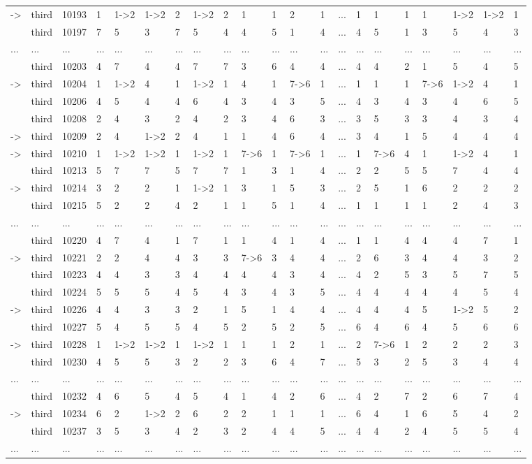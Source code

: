 \begin{landscape}
{\begin{longtable}{lllllllllllllllllllll}
-\textgreater &third&10193&1&1-\textgreater 2&1-\textgreater 2&2&1-\textgreater 2&2&1&1&2&1&...&1&1&1&1&1-\textgreater 2&1-\textgreater 2&1\tabularnewline
&third&10197&7&5&3&7&5&4&4&5&1&4&...&4&5&1&3&5&4&3\tabularnewline
...&...&...&...&...&...&...&...&...&...&...&...&...&...&...&...&...&...&...&...&...\tabularnewline
&third&10203&4&7&4&4&7&7&3&6&4&4&...&4&4&2&1&5&4&5\tabularnewline
-\textgreater &third&10204&1&1-\textgreater 2&4&1&1-\textgreater 2&1&4&1&7-\textgreater 6&1&...&1&1&1&7-\textgreater 6&1-\textgreater 2&4&1\tabularnewline
&third&10206&4&5&4&4&6&4&3&4&3&5&...&4&3&4&3&4&6&5\tabularnewline
&third&10208&2&4&3&2&4&2&3&4&6&3&...&3&5&3&3&4&3&4\tabularnewline
-\textgreater &third&10209&2&4&1-\textgreater 2&2&4&1&1&4&6&4&...&3&4&1&5&4&4&4\tabularnewline
-\textgreater &third&10210&1&1-\textgreater 2&1-\textgreater 2&1&1-\textgreater 2&1&7-\textgreater 6&1&7-\textgreater 6&1&...&1&7-\textgreater 6&4&1&1-\textgreater 2&4&1\tabularnewline
&third&10213&5&7&7&5&7&7&1&3&1&4&...&2&2&5&5&7&4&4\tabularnewline
-\textgreater &third&10214&3&2&2&1&1-\textgreater 2&1&3&1&5&3&...&2&5&1&6&2&2&2\tabularnewline
&third&10215&5&2&2&4&2&1&1&5&1&4&...&1&1&1&1&2&4&3\tabularnewline
...&...&...&...&...&...&...&...&...&...&...&...&...&...&...&...&...&...&...&...&...\tabularnewline
&third&10220&4&7&4&1&7&1&1&4&1&4&...&1&1&4&4&4&7&1\tabularnewline
-\textgreater &third&10221&2&2&4&4&3&3&7-\textgreater 6&3&4&4&...&2&6&3&4&4&3&2\tabularnewline
&third&10223&4&4&3&3&4&4&4&4&3&4&...&4&2&5&3&5&7&5\tabularnewline
&third&10224&5&5&5&4&5&4&3&4&3&5&...&4&4&4&4&4&5&4\tabularnewline
-\textgreater &third&10226&4&4&3&3&2&1&5&1&4&4&...&4&4&4&5&1-\textgreater 2&5&2\tabularnewline
&third&10227&5&4&5&5&4&5&2&5&2&5&...&6&4&6&4&5&6&6\tabularnewline
-\textgreater &third&10228&1&1-\textgreater 2&1-\textgreater 2&1&1-\textgreater 2&1&1&1&2&1&...&2&7-\textgreater 6&1&2&2&2&3\tabularnewline
&third&10230&4&5&5&3&2&2&3&6&4&7&...&5&3&2&5&3&4&4\tabularnewline
...&...&...&...&...&...&...&...&...&...&...&...&...&...&...&...&...&...&...&...&...\tabularnewline
&third&10232&4&6&5&4&5&4&1&4&2&6&...&4&2&7&2&6&7&4\tabularnewline
-\textgreater &third&10234&6&2&1-\textgreater 2&2&6&2&2&1&1&1&...&6&4&1&6&5&4&2\tabularnewline
&third&10237&3&5&3&4&2&3&2&4&4&5&...&4&4&2&4&5&5&4\tabularnewline
...&...&...&...&...&...&...&...&...&...&...&...&...&...&...&...&...&...&...&...&...\tabularnewline
\hline
\end{longtable}}\end{landscape}




